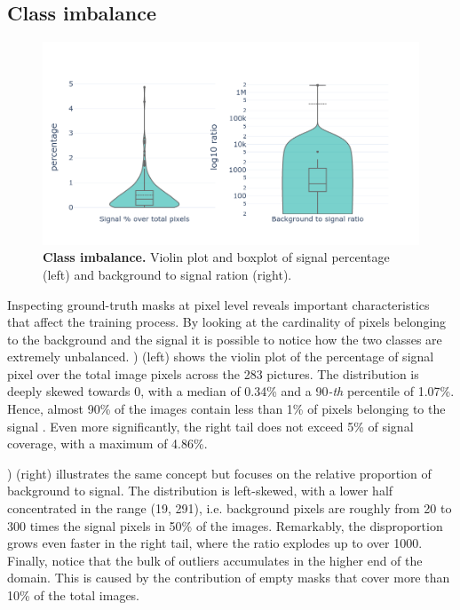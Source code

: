 \subsection{Class imbalance}
\label{sec:class_imbalance}
\begin{figure}
    \centering
    \includegraphics[width=\textwidth]{figures/120_dataset/class_imbalance.png}
    \caption{\textbf{Class imbalance.} Violin plot and boxplot of signal percentage (left) and background to signal ration (right).}
    \label{fig:dataset:class_imbalance}
\end{figure}

Inspecting ground-truth masks at pixel level reveals important characteristics that affect the training process. 
By looking at the cardinality of pixels belonging to the background and the signal it is possible to notice how the two classes are extremely unbalanced.
) (left) shows the violin plot of the percentage of signal pixel over the total image pixels across the 283 pictures.
The distribution is deeply skewed towards 0, with a median of 0.34\% and a 90\emph{-th} percentile of 1.07\%. 
Hence, almost 90\% of the images contain less than 1\% of pixels belonging to the signal%
.
Even more significantly, the right tail does not exceed 5\% of signal coverage, with a maximum of 4.86\%.

) (right) illustrates the same concept but focuses on the relative proportion of background to signal. 
The distribution is left-skewed, with a lower half concentrated in the range (19, 291), i.e. background pixels are roughly from 20 to 300 times the signal pixels in 50\% of the images.
Remarkably, the disproportion grows even faster in the right tail, where the ratio explodes up to over 1000. 
Finally, notice that the bulk of outliers accumulates in the higher end of the domain. 
This is caused by the contribution of empty masks that cover more than 10\% of the total images.


